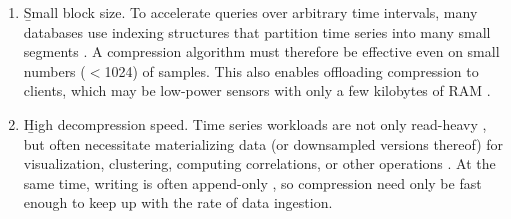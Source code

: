 \begin{enumerate}
\item \b{Small block size}. To accelerate queries over arbitrary time intervals, many databases use indexing structures that partition time series into many small segments \cite{berkeleyTreeDB, respawnDB}. A compression algorithm must therefore be effective even on small numbers ($<$1024) of samples. This also enables offloading compression to clients, which may be low-power sensors with only a few kilobytes of RAM \cite{respawnDB}.
\item \b{High decompression speed}. Time series workloads are not only read-heavy \cite{respawnDB, berkeleyTreeDB, influxDB}, but often necessitate materializing data (or downsampled versions thereof) for visualization, clustering, computing correlations, or other operations \cite{respawnDB}. At the same time, writing is often append-only \cite{gorilla, respawnDB}, so compression need only be fast enough to keep up with the rate of data ingestion.

\end{enumerate}
